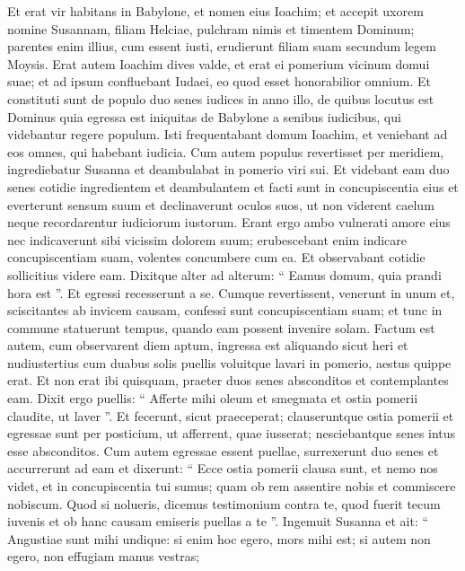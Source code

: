 \begin{biblechapter}
\begin{biblechapter}
\begin{biblechapter}
\begin{biblechapter}
\begin{biblechapter}
\begin{biblechapter}
\begin{biblechapter}
\begin{biblechapter}
\begin{biblechapter}
\begin{biblechapter}
\begin{biblechapter}
\begin{biblechapter}
\begin{biblechapter}
\verse Et erat vir habitans in Babylone, et nomen eius Ioachim; 
\verse et accepit uxorem nomine Susannam, filiam Helciae, pulchram nimis et timentem Dominum; 
 \verse parentes enim illius, cum essent iusti, erudierunt filiam suam secundum legem Moysis. 
\verse Erat autem Ioachim dives valde, et erat ei pomerium vicinum domui suae; et ad ipsum confluebant Iudaei, eo quod esset honorabilior omnium. 
\verse Et constituti sunt de populo duo senes iudices in anno illo, de quibus locutus est Dominus quia egressa est iniquitas de Babylone a senibus iudicibus, qui videbantur regere populum. 
\verse Isti frequentabant domum Ioachim, et veniebant ad eos omnes, qui habebant iudicia. 
\verse Cum autem populus revertisset per meridiem, ingrediebatur Susanna et deambulabat in pomerio viri sui. 
\verse Et videbant eam duo senes cotidie ingredientem et deambulantem et facti sunt in concupiscentia eius 
\verse et everterunt sensum suum et declinaverunt oculos suos, ut non viderent caelum neque recordarentur iudiciorum iustorum. 
\verse Erant ergo ambo vulnerati amore eius nec indicaverunt sibi vicissim dolorem suum; 
\verse erubescebant enim indicare concupiscentiam suam, volentes concumbere cum ea. 
\verse Et observabant cotidie sollicitius videre eam. Dixitque alter ad alterum: 
\verse “ Eamus domum, quia prandi hora est ”. Et egressi recesserunt a se. 
\verse Cumque revertissent, venerunt in unum et, sciscitantes ab invicem causam, confessi sunt concupiscentiam suam; et tunc in commune statuerunt tempus, quando eam possent invenire solam.
 \verse Factum est autem, cum observarent diem aptum, ingressa est aliquando sicut heri et nudiustertius cum duabus solis puellis voluitque lavari in pomerio, aestus quippe erat. 
\verse Et non erat ibi quisquam, praeter duos senes absconditos et contemplantes eam. 
\verse Dixit ergo puellis: “ Afferte mihi oleum et smegmata et ostia pomerii claudite, ut laver ”. 
\verse Et fecerunt, sicut praeceperat; clauseruntque ostia pomerii et egressae sunt per posticium, ut afferrent, quae iusserat; nesciebantque senes intus esse absconditos. 
\verse Cum autem egressae essent puellae, surrexerunt duo senes et accurrerunt ad eam et dixerunt: 
\verse “ Ecce ostia pomerii clausa sunt, et nemo nos videt, et in concupiscentia tui sumus; quam ob rem assentire nobis et commiscere nobiscum. 
 \verse Quod si nolueris, dicemus testimonium contra te, quod fuerit tecum iuvenis et ob hanc causam emiseris puellas a te ”. 
\verse Ingemuit Susanna et ait: “ Angustiae sunt mihi undique: si enim hoc egero, mors mihi est; si autem non egero, non effugiam manus vestras; 

\end{biblechapter}
\end{biblechapter}
\end{biblechapter}
\end{biblechapter}
\end{biblechapter}
\end{biblechapter}
\end{biblechapter}
\end{biblechapter}
\end{biblechapter}
\end{biblechapter}
\end{biblechapter}
\end{biblechapter}
\end{biblechapter}
